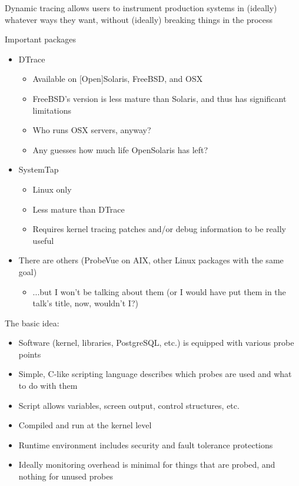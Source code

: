 \documentclass{beamer}
\begin{document}
\begin{frame}
    Dynamic tracing allows users to instrument production systems in (ideally) whatever ways they want, without (ideally) breaking things in the process
\end{frame}

\begin{frame}
    Important packages
    \begin{itemize}
        \item<2-> DTrace
        \begin{itemize}
            \item Available on [Open]Solaris, FreeBSD, and OSX
            \item FreeBSD's version is less mature than Solaris, and thus has significant limitations
            \item Who runs OSX servers, anyway?
            \item Any guesses how much life OpenSolaris has left?
        \end{itemize}
        \item<3->SystemTap
        \begin{itemize}
            \item Linux only
            \item Less mature than DTrace
            \item Requires kernel tracing patches and/or debug information to be really useful
        \end{itemize}
        \item<4-> There are others (ProbeVue on AIX, other Linux packages with the same goal)
        \begin{itemize}
            \item ...but I won't be talking about them (or I would have put them in the talk's title, now, wouldn't I?)
        \end{itemize}
    \end{itemize}
\end{frame}

\begin{frame}
    The basic idea:
    \begin{itemize}
        \item Software (kernel, libraries, PostgreSQL, etc.) is equipped with various probe points
        \item Simple, C-like scripting language describes which probes are used and what to do with them
        \item Script allows variables, screen output, control structures, etc.
        \item Compiled and run at the kernel level
        \item Runtime environment includes security and fault tolerance protections
        \item Ideally monitoring overhead is minimal for things that are probed, and nothing for unused probes
    \end{itemize}
\end{frame}
\end{document}
